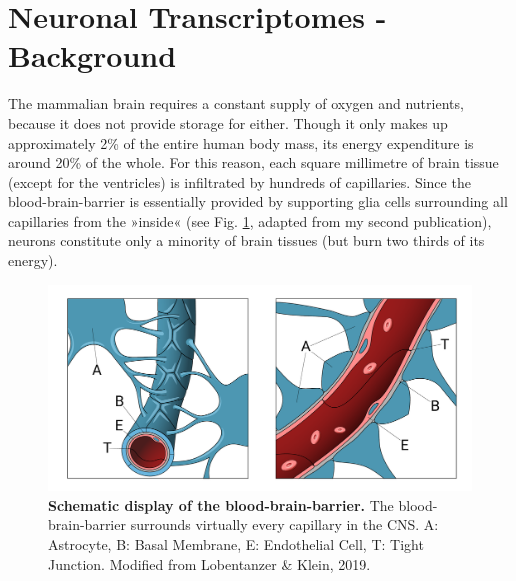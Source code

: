 \section{Neuronal Transcriptomes - Background}
The mammalian brain requires a constant supply of oxygen and nutrients, because it does not provide storage for either. Though it only makes up approximately 2\% of the entire human body mass, its energy expenditure is around 20\% of the whole\cite{Raichle2002}. For this reason, each square millimetre of brain tissue (except for the ventricles) is infiltrated by hundreds of capillaries\cite{Bohn2016}. Since the blood-brain-barrier is essentially provided by supporting glia cells surrounding all capillaries from the »inside« (see Fig. \ref{fig:bbb}, adapted from my second publication\cite{Lobentanzer2019b}), neurons constitute only a minority of brain tissues (but burn two thirds of its energy).

\begin{figure}
\includegraphics[width=\textwidth]{figures/bbb}
\caption[The blood-brain-barrier.]{\textbf{Schematic display of the blood-brain-barrier.} The blood-brain-barrier surrounds virtually every capillary in the CNS. A: Astrocyte, B: Basal Membrane, E: Endothelial Cell, T: Tight Junction. Modified from Lobentanzer \& Klein, 2019\cite{Lobentanzer2019b}.
\label{fig:bbb}}
\end{figure}

